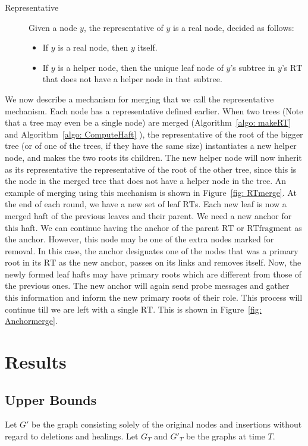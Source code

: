 \documentclass[11pt, letter]{article}
\newcommand{\RT}{\mathrm{RT}}
\newcommand{\RTfragment}{\mathrm{RTfragment}}
\begin{document}
\begin{description}
\item[Representative]
Given a node $y$, the representative of $y$ is a real node, decided as follows:
\begin{itemize}
 \item If $y$ is a real node, then $y$ itself.
 \item If $y$ is a helper node, then the unique leaf node of $y$'s subtree in $y$'s $\RT$ that does not have a helper node in that
subtree. 
\end{itemize}
\end{description}

 We now describe a mechanism for merging that we call the representative mechanism. Each node has a representative defined earlier. When
two trees (Note that a tree may even be a single node) are merged (Algorithm~\ref{algo: makeRT} and Algorithm~\ref{algo:
ComputeHaft} ), the representative of
the root of the bigger tree (or of one of the trees, if they have the same size) instantiates a new helper node, and
makes the two roots its children. The new helper node will now inherit as its representative the representative of the
root of the other tree, since this is the node in the merged tree that does not have a helper node in the tree. An
example of merging using this mechanism is shown in Figure~\ref{fig: RTmerge}.
 At the end of each round, we have a  new set of leaf $\RT$s. Each new leaf is now a
merged haft of the previous leaves and their parent. We need a new anchor for this haft. We can continue having the
anchor of the parent $\RT$ or $\RTfragment$ as the anchor. However, this
 node may be one of the extra nodes marked for removal. In this case, the anchor designates one of the nodes that was
 a primary root in its $\RT$ as the new anchor, passes on its links and removes itself.
 Now, the newly formed leaf hafts may have primary roots which are different from those of the previous ones. The new
anchor will again send probe messages and gather this information and inform the new primary roots of their role. This
process will continue till we are left with a single $\RT$. This is shown in Figure~\ref{fig: Anchormerge}. 

\section{Results}
\label{sec: Results}

\subsection{Upper Bounds}
\label{subsec: upperbounds}
Let $G'$ be the graph consisting solely of the original nodes and insertions without regard to deletions and
healings. Let $G_{T}$ and $G'_{T}$ be the graphs at time $T$. 
\end{document}
